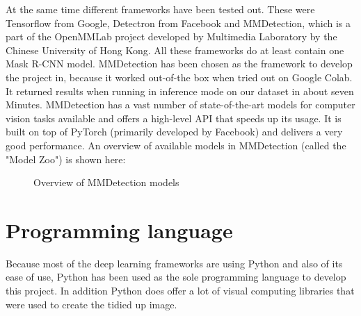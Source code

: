 At the same time different frameworks have been tested out. These were Tensorflow from Google, Detectron from Facebook and MMDetection, which is a part of the OpenMMLab project developed by Multimedia Laboratory by the Chinese University of Hong Kong. All these frameworks do at least contain one Mask R-CNN model. MMDetection has been chosen as the framework to develop the project in, because it worked out-of-the box when tried out on Google Colab. It returned results when running in inference mode on our dataset in about seven Minutes. MMDetection has a vast number of state-of-the-art models for computer vision tasks available and offers a high-level API that speeds up its usage. It is built on top of PyTorch (primarily developed by Facebook) and delivers a very good performance. An overview of available models in MMDetection (called the "Model Zoo") is shown here:

\begin{figure}[H]
	\caption{\label{fig:mmdetection-models} Overview of MMDetection models}
\end{figure}

\section{Programming language}

Because most of the deep learning frameworks are using Python and also of its ease of use, Python has been used as the sole programming language to develop this project. In addition Python does offer a lot of visual computing libraries that were used to create the tidied up image.

